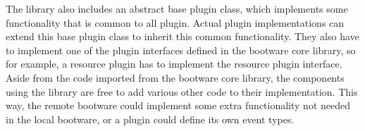 The library also includes an abstract base plugin class, which implements some functionality that is common to all plugin.
Actual plugin implementations can extend this base plugin class to inherit this common functionality.
They also have to implement one of the plugin interfaces defined in the bootware core library, so for example, a resource plugin has to implement the resource plugin interface.
Aside from the code imported from the bootware core library, the components using the library are free to add various other code to their implementation.
This way, the remote bootware could implement some extra functionality not needed in the local bootware, or a plugin could define its own event types.
